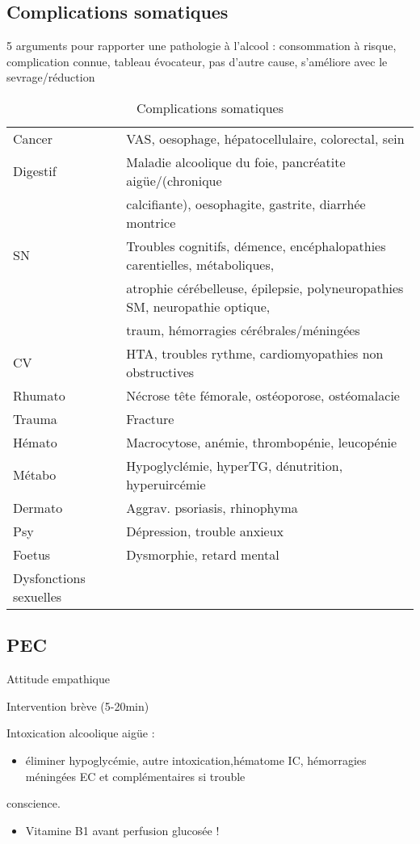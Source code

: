 \documentclass[11pt]{article}
\begin{document}
\subsection{Complications somatiques}
\label{sec:orge5b0ba8}
\begin{tcolorbox}
5 arguments pour rapporter une pathologie à l'alcool : consommation à risque,
 complication connue, tableau évocateur, pas d'autre cause, s'améliore avec le sevrage/réduction
\end{tcolorbox}
\begin{table}[htbp]
\caption{Complications somatiques}
\centering
\begin{tabular}{ll}
\toprule
Cancer & VAS, oesophage, hépatocellulaire, colorectal, sein\\
Digestif & Maladie alcoolique du foie, pancréatite aigüe/(chronique\\
 & calcifiante), oesophagite, gastrite, diarrhée montrice\\
SN & Troubles cognitifs, démence, encéphalopathies carentielles, métaboliques,\\
 & atrophie cérébelleuse, épilepsie, polyneuropathies SM, neuropathie optique,\\
 & traum, hémorragies cérébrales/méningées\\
CV & HTA, troubles rythme, cardiomyopathies non obstructives\\
Rhumato & Nécrose tête fémorale, ostéoporose, ostéomalacie\\
Trauma & Fracture\\
Hémato & Macrocytose, anémie, thrombopénie, leucopénie\\
Métabo & Hypoglyclémie, hyperTG, dénutrition, hyperuircémie\\
Dermato & Aggrav. psoriasis, rhinophyma\\
Psy & Dépression, trouble anxieux\\
Foetus & Dysmorphie, retard mental\\
Dysfonctions sexuelles & \\
\bottomrule
\end{tabular}
\end{table}

\subsection{PEC}
\label{sec:org9dd2327}
Attitude empathique

Intervention brève (5-20min)

Intoxication alcoolique aigüe : 
\begin{itemize}
\item éliminer hypoglycémie, autre intoxication,hématome IC, hémorragies méningées \thus EC et complémentaires si trouble
\end{itemize}
conscience. 
\begin{itemize}
\item \danger Vitamine B1 avant perfusion glucosée !
\end{itemize}
\end{document}
